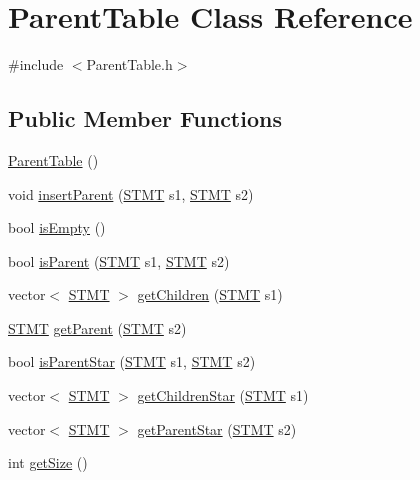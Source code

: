 \hypertarget{class_parent_table}{\section{Parent\-Table Class Reference}
\label{class_parent_table}
}


{\ttfamily \#include $<$Parent\-Table.\-h$>$}

\subsection*{Public Member Functions}
\begin{DoxyCompactItemize}
\item 
\hyperlink{class_parent_table_a3fa054014eba4cb913f1b9245263857d}{Parent\-Table} ()
\item 
void \hyperlink{class_parent_table_a775e3418a8653096b53276af58715c36}{insert\-Parent} (\hyperlink{std_afx_8h_a4a876b28ac3f59cecb39c2d2d76e4e7a}{S\-T\-M\-T} s1, \hyperlink{std_afx_8h_a4a876b28ac3f59cecb39c2d2d76e4e7a}{S\-T\-M\-T} s2)
\item 
bool \hyperlink{class_parent_table_ad7e627299fad7b2725558efb4e5b3105}{is\-Empty} ()
\item 
bool \hyperlink{class_parent_table_a879660be86e4983a0199ce0a74b59488}{is\-Parent} (\hyperlink{std_afx_8h_a4a876b28ac3f59cecb39c2d2d76e4e7a}{S\-T\-M\-T} s1, \hyperlink{std_afx_8h_a4a876b28ac3f59cecb39c2d2d76e4e7a}{S\-T\-M\-T} s2)
\item 
vector$<$ \hyperlink{std_afx_8h_a4a876b28ac3f59cecb39c2d2d76e4e7a}{S\-T\-M\-T} $>$ \hyperlink{class_parent_table_a86302e8f70ace7674fd2184654c156a8}{get\-Children} (\hyperlink{std_afx_8h_a4a876b28ac3f59cecb39c2d2d76e4e7a}{S\-T\-M\-T} s1)
\item 
\hyperlink{std_afx_8h_a4a876b28ac3f59cecb39c2d2d76e4e7a}{S\-T\-M\-T} \hyperlink{class_parent_table_ae53225a6ba566239960cca6783983a7b}{get\-Parent} (\hyperlink{std_afx_8h_a4a876b28ac3f59cecb39c2d2d76e4e7a}{S\-T\-M\-T} s2)
\item 
bool \hyperlink{class_parent_table_abdad8cbd9c06af20257361dbbb35fe2d}{is\-Parent\-Star} (\hyperlink{std_afx_8h_a4a876b28ac3f59cecb39c2d2d76e4e7a}{S\-T\-M\-T} s1, \hyperlink{std_afx_8h_a4a876b28ac3f59cecb39c2d2d76e4e7a}{S\-T\-M\-T} s2)
\item 
vector$<$ \hyperlink{std_afx_8h_a4a876b28ac3f59cecb39c2d2d76e4e7a}{S\-T\-M\-T} $>$ \hyperlink{class_parent_table_af10014b72f9b69bc3e58f251ce7d60c0}{get\-Children\-Star} (\hyperlink{std_afx_8h_a4a876b28ac3f59cecb39c2d2d76e4e7a}{S\-T\-M\-T} s1)
\item 
vector$<$ \hyperlink{std_afx_8h_a4a876b28ac3f59cecb39c2d2d76e4e7a}{S\-T\-M\-T} $>$ \hyperlink{class_parent_table_a01f37ca19b8e3f56d86279f1884e5380}{get\-Parent\-Star} (\hyperlink{std_afx_8h_a4a876b28ac3f59cecb39c2d2d76e4e7a}{S\-T\-M\-T} s2)
\item 
int \hyperlink{class_parent_table_a929a869dabe723777f337863f5d51b13}{get\-Size} ()
\end{DoxyCompactItemize}



